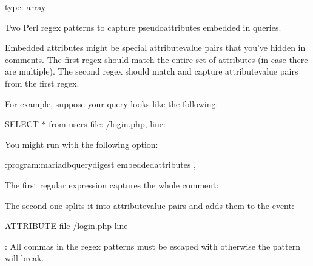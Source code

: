 \documentclass[letterpaper,10pt,english]{sphinxmanual}
\begin{document}
\begin{fulllineitems}
\label{\detokenize{mariadb-query-digest:cmdoption-mariadb-query-digest-embedded-attributes}}
type: array

Two Perl regex patterns to capture pseudo\sphinxhyphen{}attributes embedded in queries.

Embedded attributes might be special attribute\sphinxhyphen{}value pairs that you’ve hidden
in comments.  The first regex should match the entire set of attributes (in
case there are multiple).  The second regex should match and capture
attribute\sphinxhyphen{}value pairs from the first regex.

For example, suppose your query looks like the following:

\begin{sphinxVerbatim}[commandchars=\\\{\}]
SELECT * from users \PYGZhy{}\PYGZhy{} file: /login.php, line: 
\end{sphinxVerbatim}

You might run  with the following option:

\begin{sphinxVerbatim}[commandchars=\\\{\}]
:program:mariadb\PYGZhy{}query\PYGZhy{}digest \PYGZhy{}\PYGZhy{}embedded\PYGZhy{}attributes ,
\end{sphinxVerbatim}

The first regular expression captures the whole comment:

\begin{sphinxVerbatim}[commandchars=\\\{\}]
\end{sphinxVerbatim}

The second one splits it into attribute\sphinxhyphen{}value pairs and adds them to the event:

\begin{sphinxVerbatim}[commandchars=\\\{\}]
ATTRIBUTE  
  
file       /login.php
line       
\end{sphinxVerbatim}

: All commas in the regex patterns must be escaped with otherwise
the pattern will break.

\end{fulllineitems}
\end{document}
